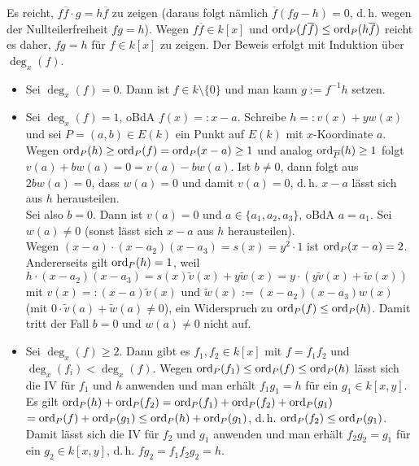 \begin{Beweis}
    Es reicht, $f\overline{f} \cdot g = h\overline{f}$ zu zeigen
    (daraus folgt nämlich $\overline{f} (fg - h) = 0$, d.\,h. wegen der Nullteilerfreiheit
    $fg = h$).
    Wegen $f\overline{f} \in k[x]$ und $\operatorname{ord}_P(f\overline{f}) \le \operatorname{ord}_P(h \overline{f})$
    reicht es daher, $fg = h$ für $f \in k[x]$ zu zeigen.
    Der Beweis erfolgt mit Induktion über $\deg_x(f)$.
    \begin{itemize}
        \item
        Sei $\deg_x(f) = 0$.
        Dann ist $f \in k \setminus \{0\}$ und man kann $g := f^{-1} h$ setzen.

        \item
        Sei $\deg_x(f) = 1$, oBdA $f(x) =: x - a$.
        Schreibe $h =: v(x) + yw(x)$ und sei $P = (a, b) \in E(k)$ ein Punkt auf $E(k)$ mit
        $x$-Koordinate $a$.
        Wegen $\operatorname{ord}_P(h) \ge \operatorname{ord}_P(f) = \operatorname{ord}_P(x - a) \ge 1$ und analog
        $\operatorname{ord}_{\overline{P}}(h) \ge 1$ folgt $v(a) + bw(a) = 0 = v(a) - bw(a)$.
        Ist $b \not= 0$, dann folgt aus $2bw(a) = 0$, dass $w(a) = 0$ und damit $v(a) = 0$,
        d.\,h. $x - a$ lässt sich aus $h$ herausteilen.\\
        Sei also $b = 0$.
        Dann ist $v(a) = 0$ und $a \in \{a_1, a_2, a_3\}$, oBdA $a = a_1$.
        Sei $w(a) \not= 0$ (sonst lässt sich $x - a$ aus $h$ herausteilen).\\
        Wegen $(x - a) \cdot (x - a_2)(x - a_3) = s(x) = y^2 \cdot 1$ ist $\operatorname{ord}_P(x - a) = 2$.\\
        Andererseits gilt $\operatorname{ord}_P(h) = 1$,
        weil $h \cdot (x - a_2)(x - a_3) = s(x) \widetilde{v}(x) + y \widetilde{w}(x)
        = y \cdot (y \widetilde{v}(x) + \widetilde{w}(x))$
        mit $v(x) =: (x - a) \widetilde{v}(x)$ und $\widetilde{w}(x) := (x - a_2) (x - a_3) w(x)$
        (mit $0 \cdot \widetilde{v}(a) + \widetilde{w}(a) \not= 0$),
        ein Widerspruch zu $\operatorname{ord}_P(f) \le \operatorname{ord}_P(h)$.
        Damit tritt der Fall $b = 0$ und $w(a) \not= 0$ nicht auf.

        \item
        Sei $\deg_x(f) \ge 2$.
        Dann gibt es $f_1, f_2 \in k[x]$ mit $f = f_1 f_2$ und $\deg_x(f_i) < \deg_x(f)$.
        Wegen $\operatorname{ord}_P(f_1) \le \operatorname{ord}_P(f) \le \operatorname{ord}_P(h)$ lässt sich die IV
        für $f_1$ und $h$ anwenden und man erhält $f_1 g_1 = h$ für ein $g_1 \in k[x, y]$.
        Es gilt
        $\operatorname{ord}_P(h) + \operatorname{ord}_P(f_2) = \operatorname{ord}_P(f_1) + \operatorname{ord}_P(f_2) + \operatorname{ord}_P(g_1)$\\
        $= \operatorname{ord}_P(f) + \operatorname{ord}_P(g_1) \le \operatorname{ord}_P(h) + \operatorname{ord}_P(g_1)$,
        d.\,h. $\operatorname{ord}_P(f_2) \le \operatorname{ord}_P(g_1)$.
        Damit lässt sich die IV für $f_2$
        und $g_1$ anwenden und man erhält $f_2 g_2 = g_1$ für ein $g_2 \in k[x, y]$,
        d.\,h. $fg_2 = f_1 f_2 g_2 = h$.
        \vspace{-7mm}
    \end{itemize}
\end{Beweis}

